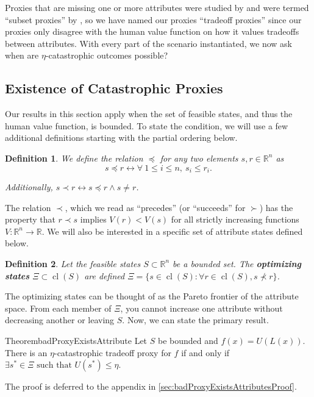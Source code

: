 \documentclass{article}
\newtheorem{Definition}{Definition}[section] \crefname{Definition}{Definition}{Definitions}
\DeclareMathOperator*{\cl}{cl}
\begin{document}
Proxies that are missing one or more attributes were studied by \citet{zhuang2020consequences} and were termed ``subset proxies'' by \citet{neth2026against}, so we have named our proxies ``tradeoff proxies'' since our proxies only disagree with the human value function on how it values tradeoffs between attributes. With every part of the scenario instantiated, we now ask when are $\eta$-catastrophic outcomes possible?

\subsection{Existence of Catastrophic Proxies}
Our results in this section apply when the set of feasible states, and thus the human value function, is bounded. To state the condition, we will use a few additional definitions starting with the partial ordering below.

\begin{Definition}\label{def:prec}
We define the relation $\bm \preceq$ for any two elements $s, r \in \mathbb R^n$ as
$$s \preceq r \longleftrightarrow \forall\ 1 \leq i \leq n, \ s_i \leq r_i.$$

Additionally, $s \prec r \longleftrightarrow s \preceq r \wedge s \neq r$.
\end{Definition}

The relation $\prec$, which we read as ``precedes'' (or ``succeeds'' for $\succ$) has the property that $r \prec s$ implies $V(r) < V(s)$ for all strictly increasing functions $V : \mathbb R^n \rightarrow \mathbb R$. We will also be interested in a specific set of attribute states defined below.

\begin{Definition}\label{def:optimizingStates}
Let the feasible states $S \subset \mathbb R^n$ be a bounded set. The \textbf{optimizing states} $\Xi \subset \cl(S)$ are defined $\Xi = \{s \in \cl(S) : \forall r \in \cl(S),  s \not\prec r\}$.
\end{Definition}

The optimizing states can be thought of as the Pareto frontier of the attribute space. From each member of $\Xi$, you cannot increase one attribute without decreasing another or leaving $S$. Now, we can state the primary result.

\begin{restatable}{Theorem}{badProxyExistsAttribute}\label{thm:badProxyExistsAttribute}
Let $S$ be bounded and $f(x) = U(L(x))$. There is an $\eta$-catastrophic tradeoff proxy for $f$ if and only if $\exists s^* \in \Xi \text{ such that } U(s^*) \leq \eta$.
\end{restatable}
The proof is deferred to the appendix in \cref{sec:badProxyExistsAttributesProof}.\\
\end{document}
